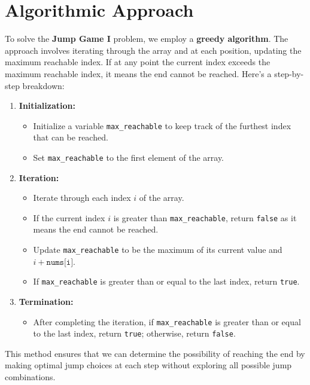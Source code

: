 \section*{Algorithmic Approach}

To solve the \textbf{Jump Game I} problem, we employ a \textbf{greedy algorithm}. The approach involves iterating through the array and at each position, updating the maximum reachable index. If at any point the current index exceeds the maximum reachable index, it means the end cannot be reached. Here's a step-by-step breakdown:

\begin{enumerate}
    \item \textbf{Initialization:}
    \begin{itemize}
        \item Initialize a variable \texttt{max\_reachable} to keep track of the furthest index that can be reached.
        \item Set \texttt{max\_reachable} to the first element of the array.
    \end{itemize}
    
    \item \textbf{Iteration:}
    \begin{itemize}
        \item Iterate through each index \(i\) of the array.
        \item If the current index \(i\) is greater than \texttt{max\_reachable}, return \texttt{false} as it means the end cannot be reached.
        \item Update \texttt{max\_reachable} to be the maximum of its current value and \(i + \texttt{nums[i]}\).
        \item If \texttt{max\_reachable} is greater than or equal to the last index, return \texttt{true}.
    \end{itemize}
    
    \item \textbf{Termination:}
    \begin{itemize}
        \item After completing the iteration, if \texttt{max\_reachable} is greater than or equal to the last index, return \texttt{true}; otherwise, return \texttt{false}.
    \end{itemize}
\end{enumerate}

This method ensures that we can determine the possibility of reaching the end by making optimal jump choices at each step without exploring all possible jump combinations.

